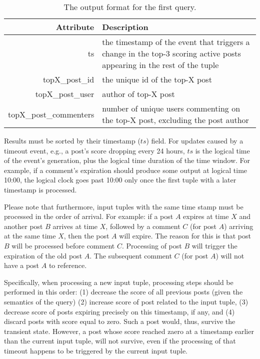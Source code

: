 \documentclass{sig-alternate}
\begin{document}
\begin{table}[ht]
	\caption{The output format for the first query.}
	\centering 
	\begin{tabular}{r p{5.2cm}}
		\toprule
		Attribute		&	 Description\\
		\midrule
		ts			&	the timestamp of the event that triggers a change in the top-3 scoring active posts appearing in the rest of the tuple\\[2ex]
		topX\_post\_id	&	the unique id of the top-X post\\[2ex]		
		topX\_post\_user	& 	 author of top-X post\\[2ex]		
		topX\_post\_commenters & number of unique users commenting on the top-X post, excluding the post author\\[2ex]
		\bottomrule 
	\end{tabular}
	\label{table:query1}
\end{table}

Results must be sorted by their timestamp ($ts$) field. For updates caused by a timeout event, e.g., a post's score dropping every 24 hours, $ts$ is the logical time of the event's generation, plus the logical time duration of the time window. For example, if a comment's expiration should produce some output at logical time 10:00, the logical clock goes past 10:00 only once the first tuple with a later timestamp is processed.

Please note that furthermore, input tuples with the same time stamp must be processed in the order of arrival. For example: if a post $A$ expires at time $X$ and another post $B$ arrives at time $X$, followed by a comment $C$ (for post $A$) arriving at the same time $X$, then the post $A$ will expire. The reason for this is that post $B$ will be processed before comment $C$. Processing of post $B$ will trigger the expiration of the old post $A$. The subsequent comment $C$ (for post $A$) will not have a post $A$ to reference.

Specifically, when processing a new input tuple, processing steps should be performed in this order: (1) decrease the score of all previous posts (given the semantics of the query) (2) increase score of post related to the input tuple, (3) decrease score of posts expiring precisely on this timestamp, if any, and (4) discard posts with score equal to zero. Such a post would, thus, survive the transient state. However, a post whose score reached zaero at a timestamp earlier than the current input tuple, will not survive, even if the processing of that timeout happens to be triggered by the current input tuple. 
\end{document}
